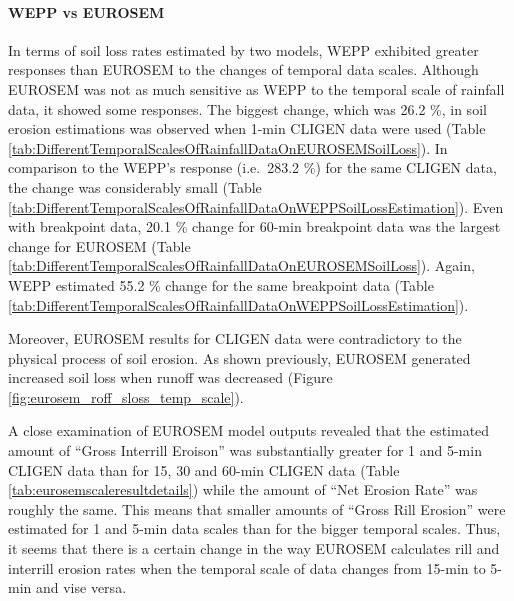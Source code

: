 \paragraph{WEPP vs EUROSEM} In terms of soil loss rates estimated by two
models, WEPP exhibited greater responses than EUROSEM to the changes of temporal
data scales. Although EUROSEM was not as much sensitive as WEPP to the temporal
scale of rainfall data, it showed some responses. The biggest change, which was
26.2 \%, in soil erosion estimations was observed when 1-min CLIGEN data were
used (Table \ref{tab:DifferentTemporalScalesOfRainfallDataOnEUROSEMSoilLoss}).
In comparison to the WEPP's response (i.e.\ 283.2 \%) for the same CLIGEN data,
the change was considerably small (Table
\ref{tab:DifferentTemporalScalesOfRainfallDataOnWEPPSoilLossEstimation}). Even
with breakpoint data, 20.1 \% change for 60-min breakpoint data was the largest
change for EUROSEM (Table
\ref{tab:DifferentTemporalScalesOfRainfallDataOnEUROSEMSoilLoss}). Again, WEPP
estimated 55.2 \% change for the same breakpoint data (Table
\ref{tab:DifferentTemporalScalesOfRainfallDataOnWEPPSoilLossEstimation}).

Moreover, EUROSEM results for CLIGEN data were contradictory to the physical
process of soil erosion. As shown previously, EUROSEM generated increased soil
loss when runoff was decreased (Figure \ref{fig:eurosem_roff_sloss_temp_scale}).

A close examination of EUROSEM model outputs revealed that the estimated amount
of ``Gross Interrill Eroison'' was substantially greater for 1 and 5-min CLIGEN
data than for 15, 30 and 60-min CLIGEN data (Table
\ref{tab:eurosemscaleresultdetails}) while the amount of ``Net Erosion Rate''
was roughly the same. This means that smaller amounts of ``Gross Rill Erosion''
were estimated for 1 and 5-min data scales than for the bigger temporal scales.
Thus, it seems that there is a certain change in the way EUROSEM calculates rill
and interrill erosion rates when the temporal scale of data changes from 15-min
to 5-min and vise versa.

